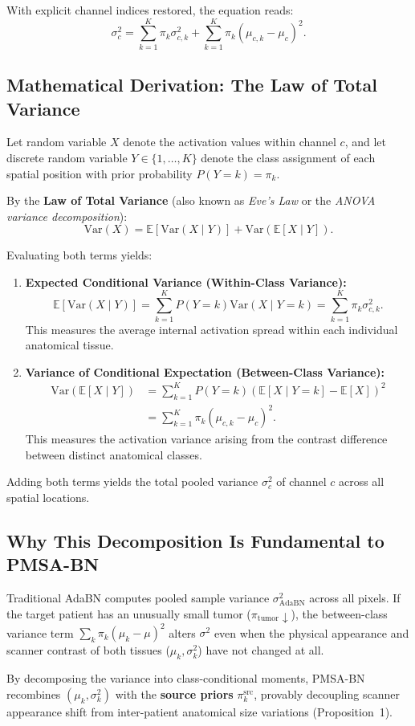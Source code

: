 \documentclass[11pt,a4paper]{article}
\begin{document}
With explicit channel indices restored, the equation reads:
\begin{equation}
    \sigma_c^2 = \sum_{k=1}^K \pi_k \sigma_{c,k}^2 + \sum_{k=1}^K \pi_k \left(\mu_{c,k} - \mu_c\right)^2.
\end{equation}

\subsection{Mathematical Derivation: The Law of Total Variance}
Let random variable $X$ denote the activation values within channel $c$, and let discrete random variable $Y \in \{1, \dots, K\}$ denote the class assignment of each spatial position with prior probability $P(Y = k) = \pi_k$.

By the \textbf{Law of Total Variance} (also known as \emph{Eve's Law} or the \emph{ANOVA variance decomposition}):
\begin{equation}
    \mathrm{Var}(X) = \mathbb{E}\left[\mathrm{Var}(X \mid Y)\right] + \mathrm{Var}\left(\mathbb{E}[X \mid Y]\right).
\end{equation}

Evaluating both terms yields:
\begin{enumerate}
    \item \textbf{Expected Conditional Variance (Within-Class Variance):}
    \begin{equation}
        \mathbb{E}\left[\mathrm{Var}(X \mid Y)\right] = \sum_{k=1}^K P(Y=k) \mathrm{Var}(X \mid Y=k) = \sum_{k=1}^K \pi_k \sigma_{c,k}^2.
    \end{equation}
    This measures the average internal activation spread within each individual anatomical tissue.
    \item \textbf{Variance of Conditional Expectation (Between-Class Variance):}
    \begin{align}
        \mathrm{Var}\left(\mathbb{E}[X \mid Y]\right) &= \sum_{k=1}^K P(Y=k)\left(\mathbb{E}[X \mid Y=k] - \mathbb{E}[X]\right)^2 \nonumber \\
        &= \sum_{k=1}^K \pi_k \left(\mu_{c,k} - \mu_c\right)^2.
    \end{align}
    This measures the activation variance arising from the contrast difference between distinct anatomical classes.
\end{enumerate}

Adding both terms yields the total pooled variance $\sigma_c^2$ of channel $c$ across all spatial locations.

\subsection{Why This Decomposition Is Fundamental to PMSA-BN}
Traditional AdaBN computes pooled sample variance $\sigma^2_{\mathrm{AdaBN}}$ across all pixels. If the target patient has an unusually small tumor ($\pi_{\mathrm{tumor}} \downarrow$), the between-class variance term $\sum_k \pi_k (\mu_k - \mu)^2$ alters $\sigma^2$ even when the physical appearance and scanner contrast of both tissues ($\mu_k, \sigma_k^2$) have not changed at all. 

By decomposing the variance into class-conditional moments, PMSA-BN recombines $(\mu_k, \sigma_k^2)$ with the \textbf{source priors} $\pi_k^{\mathrm{src}}$, provably decoupling scanner appearance shift from inter-patient anatomical size variations (Proposition~1).
\end{document}
